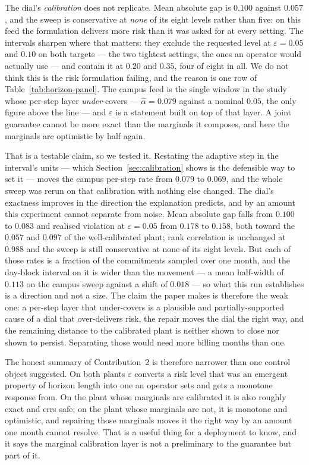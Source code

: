 The dial's \emph{calibration} does not replicate. Mean absolute gap is $0.100$
against $0.057$, and the sweep is conservative at \emph{none} of its eight
levels rather than five: on this feed the formulation delivers more risk than
it was asked for at every setting. The intervals sharpen where that matters:
they exclude the requested level at $\varepsilon=0.05$ and $0.10$ on both
targets --- the two tightest settings, the ones an operator would actually use
--- and contain it at $0.20$ and $0.35$, four of eight in all. We do not think this is the risk
formulation failing, and the reason is one row of
Table~\ref{tab:horizon-panel}. The campus feed is the single window in the
study whose per-step layer \emph{under}-covers --- $\hat\alpha = 0.079$
against a nominal $0.05$, the only figure above the line --- and $\varepsilon$
is a statement built on top of that layer. A joint guarantee cannot be more
exact than the marginals it composes, and here the marginals are optimistic by
half again.

That is a testable claim, so we tested it. Restating the adaptive step in the
interval's units --- which Section~\ref{sec:calibration} shows is the
defensible way to set it --- moves the campus per-step rate from $0.079$ to
$0.069$, and the whole sweep was rerun on that calibration with nothing else
changed. The dial's exactness improves in the direction the explanation
predicts, and by an amount this experiment cannot separate from noise. Mean
absolute gap falls from $0.100$ to $0.083$ and realised violation at
$\varepsilon=0.05$ from $0.178$ to $0.158$, both toward the $0.057$ and $0.097$
of the well-calibrated plant; rank correlation is unchanged at $0.988$ and the
sweep is still conservative at none of its eight levels. But each of those
rates is a fraction of the commitments sampled over one month, and the
day-block interval on it is wider than the movement --- a mean half-width of
$0.113$ on the campus sweep against a shift of $0.018$ --- so what this run
establishes is a direction and not a size. The claim the paper makes is
therefore the weak one: a per-step layer that under-covers is a plausible and
partially-supported cause of a dial that over-delivers risk, the repair moves
the dial the right way, and the remaining distance to the calibrated plant is
neither shown to close nor shown to persist. Separating those would need more
billing months than one.

The honest summary of Contribution~2 is therefore narrower than one control
object suggested. On both plants $\varepsilon$ converts a risk level that was
an emergent property of horizon length into one an operator sets and gets a
monotone response from. On the plant whose marginals are calibrated it is also
roughly exact and errs safe; on the plant whose marginals are not, it is
monotone and optimistic, and repairing those marginals moves it the right way
by an amount one month cannot resolve. That is a useful thing for a deployment to know, and
it says the marginal calibration layer is not a preliminary to the guarantee
but part of it.

